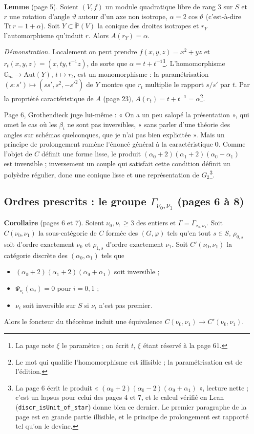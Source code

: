 \documentclass[11pt,a4paper]{article}
\begin{document}
\textbf{Lemme} (page 5). Soient $(V, f)$ un module quadratique libre de rang
$3$ sur $S$ et $r$ une rotation d'angle $\vartheta$ autour d'un axe non
isotrope, $\alpha = 2\cos\vartheta$ (c'est-à-dire $\mathrm{Tr}\, r = 1 +
\alpha$). Soit $Y \subset \check{\mathbb{P}}(V)$ la conique des droites
isotropes et $r_Y$ l'automorphisme qu'induit $r$. Alors $A(r_Y) = \alpha$.

\emph{Démonstration.} Localement on peut prendre $f(x, y, z) = x^2 + yz$ et
$r_t(x, y, z) = (x, ty, t^{-1}z)$, de sorte que $\alpha = t +
t^{-1}$\footnote{La page note $\xi$ le paramètre ; on écrit $t$, $\xi$ étant
réservé à la page 61.}. L'homomorphisme $\mathbb{G}_m \to
\mathrm{Aut}(Y)$, $t \mapsto r_t$, est un monomorphisme : la paramétrisation
$(s : s') \mapsto (ss', s^2, -s'^2)$ de $Y$ montre que $r_t$ multiplie le
rapport $s/s'$ par $t$. Par la propriété caractéristique de $A$ (page 23),
$A(r_t) = t + t^{-1} = \alpha$\footnote{Le mot qui qualifie
l'homomorphisme est illisible ; la paramétrisation est de l'édition.}.

Page 6, Grothendieck juge lui-même : « On a un peu salopé la présentation »,
qui omet le cas où les $\beta_i$ ne sont pas inversibles, « sans parler d'une
théorie des angles sur schémas quelconques, que je n'ai pas bien
explicitée ». Mais un principe de prolongement ramène l'énoncé général à la
caractéristique $0$. Comme l'objet de $C$ définit une forme lisse, le produit
$(\alpha_0 + 2)(\alpha_1 + 2)(\alpha_0 + \alpha_1)$ est inversible ;
inversement un couple qui satisfait cette condition définit un polyèdre
régulier, donc une conique lisse et une représentation de
$G_2$\footnote{La page 6 écrit le produit « $(\alpha_0 + 2)(\alpha_0 -
2)(\alpha_0 + \alpha_1)$ », lecture nette ; c'est un lapsus pour celui des
pages 4 et 7, et le calcul vérifié en Lean (\texttt{discr\_isUnit\_of\_star})
donne bien ce dernier. Le premier paragraphe de la page est en grande partie
illisible, et le principe de prolongement est rapporté tel qu'on le
devine.}.

\subsection*{Ordres prescrits : le groupe $\Gamma_{\nu_0,\nu_1}$ (pages 6 à 8)}

\textbf{Corollaire} (pages 6 et 7). Soient $\nu_0, \nu_1 \geq 3$ des entiers
et $\Gamma = \Gamma_{\nu_0, \nu_1}$. Soit $C(\nu_0, \nu_1)$ la sous-catégorie
de $C$ formée des $(G, \varphi)$ tels qu'en tout $s \in S$, $\rho_{0,s}$ soit
d'ordre exactement $\nu_0$ et $\rho_{1,s}$ d'ordre exactement $\nu_1$. Soit
$C'(\nu_0, \nu_1)$ la catégorie discrète des $(\alpha_0, \alpha_1)$ tels que
\begin{itemize}
  \item[a)] $(\alpha_0 + 2)(\alpha_1 + 2)(\alpha_0 + \alpha_1)$ soit
    inversible ;
  \item[b)] $\Psi_{\nu_i}(\alpha_i) = 0$ pour $i = 0, 1$ ;
  \item[c)] $\nu_i$ soit inversible sur $S$ si $\nu_i$ n'est pas premier.
\end{itemize}
Alors le foncteur du théorème induit une équivalence $C(\nu_0, \nu_1) \to
C'(\nu_0, \nu_1)$.
\end{document}
